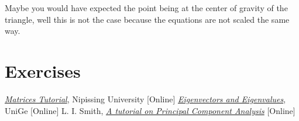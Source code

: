 Maybe you would have expected the point being at the center of gravity of the triangle, well this is not the case because the equations are not scaled the same way.




\section*{Exercises}


\begin{thebibliography}{9}
\href{https://algebra.nipissingu.ca/tutorials/matrices.html}{\emph{Matrices Tutorial}}, Nipissing University [Online]
\href{http://macosa.dima.unige.it/mat/calculus/eigenstuff.htm}{\emph{Eigenvectors and Eigenvalues}}, UniGe [Online]
 L. I. Smith, \href{http://www.iro.umontreal.ca/~pift6080/H09/documents/papers/pca_tutorial.pdf}{\emph{A tutorial on Principal Component Analysis}} [Online]
\end{thebibliography}
